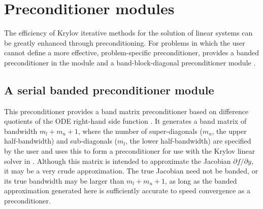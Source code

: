 \section{Preconditioner modules}\label{ss:preconds}

The efficiency of Krylov iterative methods for the solution of linear systems 
can be greatly enhanced through preconditioning. For problems in which the 
user cannot define a more effective, problem-specific preconditioner,
{\cvodes} provides a banded preconditioner in the module {\cvbandpre} and
a band-block-diagonal preconditioner module {\cvbbdpre}.

\subsection{A serial banded preconditioner module}\label{sss:cvbandpre}


This preconditioner provides a band matrix preconditioner based on
difference quotients of the ODE right-hand side function .
It generates a band matrix of bandwidth $m_l + m_u + 1$, where
the number of super-diagonals ($m_u$, the upper half-bandwidth) and
sub-diagonals ($m_l$, the lower half-bandwidth) are specified by
the user and uses this to form a preconditioner for use with the Krylov
linear solver in {\cvspgmr}.  Although this matrix is intended
to approximate the Jacobian $\partial f / \partial y$, 
it may be a very crude approximation.  The true Jacobian need not be banded, or its
true bandwidth may be larger than $m_l + m_u + 1$, as long as the
banded approximation generated here is sufficiently accurate
to speed convergence as a preconditioner. 

